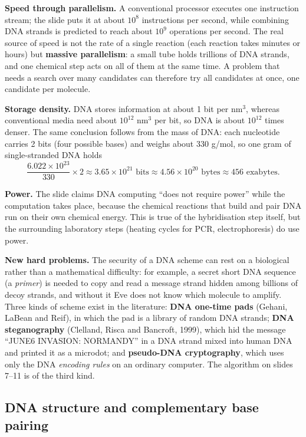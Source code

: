 \textbf{Speed through parallelism.} A conventional processor executes one instruction stream; the slide puts it at about $10^8$ instructions per second, while combining DNA strands is predicted to reach about $10^9$ operations per second. The real source of speed is not the rate of a single reaction (each reaction takes minutes or hours) but \textbf{massive parallelism}: a small tube holds trillions of DNA strands, and one chemical step acts on all of them at the same time. A problem that needs a search over many candidates can therefore try all candidates at once, one candidate per molecule.

\textbf{Storage density.} DNA stores information at about 1 bit per nm$^3$, whereas conventional media need about $10^{12}$ nm$^3$ per bit, so DNA is about $10^{12}$ times denser. The same conclusion follows from the mass of DNA: each nucleotide carries 2 bits (four possible bases) and weighs about 330 g/mol, so one gram of single-stranded DNA holds
\[
\frac{6.022 \times 10^{23}}{330} \times 2 \approx 3.65 \times 10^{21} \text{ bits} \approx 4.56 \times 10^{20} \text{ bytes} \approx 456 \text{ exabytes}.
\]

\textbf{Power.} The slide claims DNA computing ``does not require power'' while the computation takes place, because the chemical reactions that build and pair DNA run on their own chemical energy. This is true of the hybridisation step itself, but the surrounding laboratory steps (heating cycles for PCR, electrophoresis) do use power.

\textbf{New hard problems.} The security of a DNA scheme can rest on a biological rather than a mathematical difficulty: for example, a secret short DNA sequence (a \emph{primer}) is needed to copy and read a message strand hidden among billions of decoy strands, and without it Eve does not know which molecule to amplify. Three kinds of scheme exist in the literature: \textbf{DNA one-time pads} (Gehani, LaBean and Reif), in which the pad is a library of random DNA strands; \textbf{DNA steganography} (Clelland, Risca and Bancroft, 1999), which hid the message ``JUNE6 INVASION: NORMANDY'' in a DNA strand mixed into human DNA and printed it as a microdot; and \textbf{pseudo-DNA cryptography}, which uses only the DNA \emph{encoding rules} on an ordinary computer. The algorithm on slides 7--11 is of the third kind.

\subsection{DNA structure and complementary base pairing \new}


